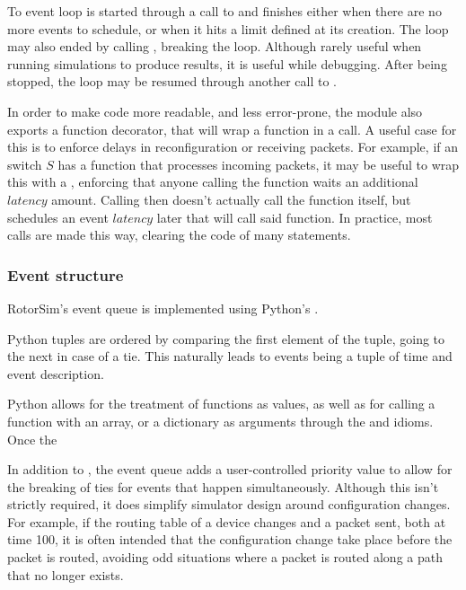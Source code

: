To event loop is started through a call to  and finishes either when there are no more events to schedule, or when it hits a limit defined at its creation.
The loop may also ended by calling , breaking the loop.
Although rarely useful when running simulations to produce results, it is useful while debugging.
After being stopped, the loop may be resumed through another call to .

In order to make code more readable, and less error-prone, the module also exports a function decorator,  that will wrap a function in a call.
A useful case for this is to enforce delays in reconfiguration or receiving packets.
For example, if an switch $S$ has a  function that processes incoming packets, it may be useful to wrap this with a , enforcing that anyone calling the function waits an additional $latency$ amount.
Calling  then doesn't actually call the function itself, but schedules an event $latency$ later that will call said function.
In practice, most calls are made this way, clearing the code of many  statements.




\subsubsection{Event structure} \label{rotorsim-eventq-event}
RotorSim's event queue is implemented using Python's  \cite{noauthor_heapq_nodate}.

Python tuples are ordered by comparing the first element of the tuple, going to the next in case of a tie.
This naturally leads to events being a tuple of time and event description.

Python allows for the treatment of functions as values, as well as for calling a function with an array, or a dictionary as arguments through the  and  idioms.
Once the

In addition to , the event queue adds a user-controlled priority value to allow for the breaking of ties for events that happen simultaneously.
Although this isn't strictly required, it does simplify simulator design around configuration changes.
For example, if the routing table of a device changes and a packet sent, both at time 100, it is often intended that the configuration change take place before the packet is routed, avoiding odd situations where a packet is routed along a path that no longer exists.

